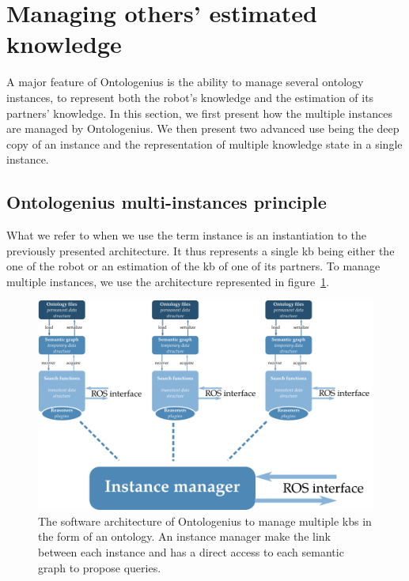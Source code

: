 \section{Managing others' estimated knowledge}

A major feature of Ontologenius is the ability to manage several ontology instances, to represent both the robot's knowledge and the estimation of its partners' knowledge. In this section, we first present how the multiple instances are managed by Ontologenius. We then present two advanced use being the deep copy of an instance and the representation of multiple knowledge state in a single instance.

\subsection{Ontologenius multi-instances principle}

What we refer to when we use the term instance is an instantiation to the previously presented architecture. It thus represents a single \acrlong{kb} being either the one of the robot or an estimation of the \acrlong{kb} of one of its partners. To manage multiple instances, we use the architecture represented in figure~\ref{fig:chap2_archi_multi}.

\begin{figure}[ht!]
\centering
\includegraphics[width=\textwidth]{figures/chapter2/archi_multi.png}
\caption{\label{fig:chap2_archi_multi} The software architecture of Ontologenius to manage multiple \acrlong{kb}s in the form of an ontology. An instance manager make the link between each instance and has a direct access to each semantic graph to propose queries. }
\end{figure}

